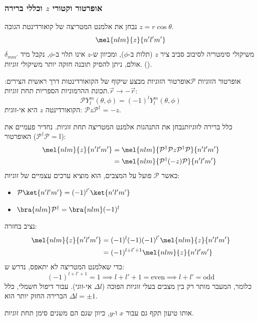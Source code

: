 \subsubsection{אופרטור וקטורי $z$ וכללי ברירה}
נבחן את אלמנט המטריצה של קואורדינטת הגובה $z = r\cos\theta$.
\begin{equation}
    \mel{n l m}{z}{n' l' m'}
\end{equation}משיקולי סימטריה לסיבוב סביב ציר $z$ (תלות ב-$\phi$), ומכיוון ש-$z$
אינו תלוי ב-$\phi$, נקבל מיד $\delta_{mm'}$.אולם, ניתן להסיק תובנה חזקה יותר משיקולי
זוגיות ().
\begin{definitionbox}
    {אופרטור הזוגיות $\mathcal{P}$}אופרטור הזוגיות מבצע שיקוף של הקואורדינטות
    דרך ראשית הצירים: $\vec{r}\rightarrow -\vec{r}$.תכונת ההרמוניות הספריות תחת זוגיות:
    \begin{equation}
        \mathcal{P}Y_{l}^{m}(\theta, \phi) = (-1)^{l} Y_{l}^{m}(\theta, \phi)
    \end{equation}הקואורדינטה $z$ היא אי-זוגית:
    $\mathcal{P}z \mathcal{P}^{\dagger} = -z$.
\end{definitionbox}
\begin{theorembox}
    {כלל ברירה לזוגיות}נבחן את התנהגות אלמנט המטריצה תחת זוגיות. נחדיר פעמיים את
    האופרטור ($\mathcal{P}^{\dagger} \mathcal{P}= \mathbb{I}$):
    \begin{align}
    \mel{nlm}{z}{n'l'm'}
    &= \mel{nlm}{\mathcal{P}^\dagger \mathcal{P} z \mathcal{P}^\dagger \mathcal{P}}{n'l'm'} \notag \\
    &= \mel{nlm}{\mathcal{P}^\dagger (-z) \mathcal{P}}{n'l'm'}
    \end{align}
    כאשר $\mathcal{P}$
    פועל על המצבים, הוא מוציא ערכים עצמיים של זוגיות:
    \begin{itemize}
        \item $\mathcal{P}\ket{n'l'm'}= (-1)^{l'}\ket{n'l'm'}$

        \item $\bra{nlm}\mathcal{P}^{\dagger} = \bra{nlm}(-1)^{l}$
    \end{itemize}
    נציב בחזרה:
    \begin{align}
    \mel{nlm}{z}{n'l'm'} &= (-1)^l (-1) (-1)^{l'} \mel{nlm}{z}{n'l'm'} \notag \\
    &= (-1)^{l+l'+1} \mel{nlm}{z}{n'l'm'}
    \end{align}
    כדי שאלמנט המטריצה לא יתאפס, נדרש ש:
    \begin{equation}
        (-1)^{l+l'+1}= 1 \implies l+l'+1 = \text{even}\implies l+l' = \text{odd}
    \end{equation}כלומר, המעבר מותר רק בין מצבים בעלי זוגיות הפוכה ($\Delta l$
    אי-זוגי). עבור דיפול חשמלי, כלל הברירה החזק יותר הוא $\Delta l = \pm 1$.
\end{theorembox}אותו טיעון תקף גם עבור $x$ ו-$y$, כיוון שגם הם משנים סימן תחת
זוגיות.
